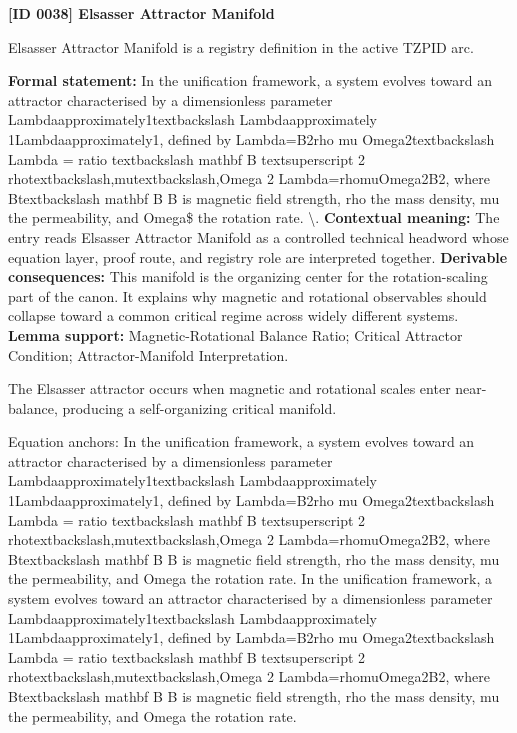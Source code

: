 \clearpage
\noindent\textbf{[ID 0038] Elsasser Attractor Manifold}\par
\vspace{0.35em}
\begingroup\small
{}
Elsasser Attractor Manifold is a registry definition in the active TZPID arc.

\begingroup\footnotesize\setlength{\emergencystretch}{3em}\sloppy
\textbf{Formal statement:} In the unification framework, a system evolves toward an attractor characterised by a dimensionless parameter Lambdaapproximately1textbackslash Lambdaapproximately 1Lambdaapproximately1, defined by Lambda=B2rho mu Omega2textbackslash Lambda = ratio textbackslash mathbf B textsuperscript 2 rhotextbackslash,mutextbackslash,Omega 2 Lambda=rhomuOmega2B2, where Btextbackslash mathbf B B is magnetic field strength, rho the mass density, mu the permeability, and Omega\$ the rotation rate. \textbackslash{}. \textbf{Contextual meaning:} The entry reads Elsasser Attractor Manifold as a controlled technical headword whose equation layer, proof route, and registry role are interpreted together. \textbf{Derivable consequences:} This manifold is the organizing center for the rotation-scaling part of the canon. It explains why magnetic and rotational observables should collapse toward a common critical regime across widely different systems. \textbf{Lemma support:} Magnetic-Rotational Balance Ratio; Critical Attractor Condition; Attractor-Manifold Interpretation.\par
\endgroup

The Elsasser attractor occurs when magnetic and rotational scales enter near-balance, producing a self-organizing critical manifold.

Equation anchors: In the unification framework, a system evolves toward an attractor characterised by a dimensionless parameter Lambdaapproximately1textbackslash Lambdaapproximately 1Lambdaapproximately1, defined by Lambda=B2rho mu Omega2textbackslash Lambda = ratio textbackslash mathbf B textsuperscript 2 rhotextbackslash,mutextbackslash,Omega 2 Lambda=rhomuOmega2B2, where Btextbackslash mathbf B B is magnetic field strength, rho the mass density, mu the permeability, and Omega the rotation rate. In the unification framework, a system evolves toward an attractor characterised by a dimensionless parameter Lambdaapproximately1textbackslash Lambdaapproximately 1Lambdaapproximately1, defined by Lambda=B2rho mu Omega2textbackslash Lambda = ratio textbackslash mathbf B textsuperscript 2 rhotextbackslash,mutextbackslash,Omega 2 Lambda=rhomuOmega2B2, where Btextbackslash mathbf B B is magnetic field strength, rho the mass density, mu the permeability, and Omega the rotation rate.

